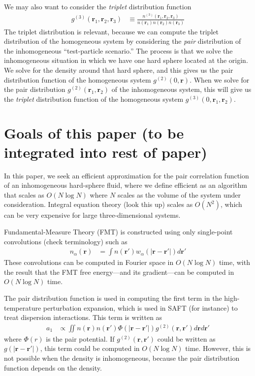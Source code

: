\documentclass[letterpaper,twocolumn,amsmath,amssymb,pre]{revtex4-1}
\newcommand{\rr}{\textbf{r}}
\begin{document}
We may also want to consider the \emph{triplet} distribution function
\begin{align}
  g^{(3)}(\rr_1,\rr_2,\rr_3) &\equiv \frac{n^{(3)}(\rr_1,\rr_2,\rr_3)}{n(\rr_1)n(\rr_2)n(\rr_3)}
\end{align}
The triplet distribution is relevant, because we can compute the
triplet distribution of the homogeneous system by considering the
\emph{pair} distribution of the inhomogeneous ``test-particle
scenario.''  The process is that we solve the inhomogeneous situation
in which we have one hard sphere located at the origin.  We solve for
the density around that hard sphere, and this gives us the pair
distribution function of the homogeneous system $g^{(2)}(0, \rr)$.
When we solve for the pair distribution $g^{(2)}(\rr_1,\rr_2)$ of the
inhomogeneous system, this will give us the \emph{triplet}
distribution function of the homogeneous system
$g^{(3)}(0,\rr_1,\rr_2)$.

\section{Goals of this paper (to be integrated into rest of paper)}


In this paper, we seek an efficient approximation for the pair
correlation function of an inhomogeneous hard-sphere fluid, where we
define efficient as an algorithm that scales as $O(N\log N)$ where $N$
scales as the volume of the system under consideration.
Integral equation theory (look this up) scales as $O(N^2)$, which can
be very expensive for large three-dimensional systems.

Fundamental-Measure Theory (FMT) is constructed using only single-point
convolutions (check terminology) such as
\begin{align}
  n_\alpha(\rr) &= \int n(\rr')w_\alpha(|\rr-\rr'|) d\rr'
\end{align}
These convolutions can be computed in Fourier space in $O(N\log N)$
time, with the result that the FMT free energy---and its
gradient---can be computed in $O(N\log N)$ time.

The pair distribution function is used in computing the first term in
the high-temperature perturbation expansion, which is used in SAFT
(for instance) to treat dispersion interactions.  This term is written
as
\begin{align}\label{eq:a1}
  a_1 &\propto \iint n(\rr)n(\rr') \Phi(|\rr-\rr'|)
  g^{(2)}(\rr,\rr')d\rr d\rr'
\end{align}
where $\Phi(r)$ is the pair potential.  If $g^{(2)}(\rr,\rr')$ could
be written as $g(|\rr-\rr'|)$, this term could be computed in $O(N\log
N)$ time.  However, this is not possible when the density is
inhomogeneous, because the pair distribution function depends on the
density.
\end{document}
